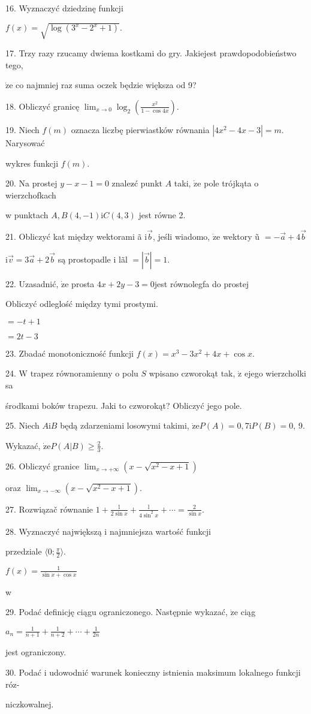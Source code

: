 \documentclass[a4paper,12pt]{article}
\begin{document}
16. Wyznaczyć dziedzinę funkcji

$f(x)=\sqrt{\log(3^{x}-2^{x}+1)}.$

17. Trzy razy rzucamy dwiema kostkami do gry. Jakiejest prawdopodobieństwo tego,

$\dot{\mathrm{z}}\mathrm{e}$ co najmniej raz suma oczek będzie większa od 9?

18. Obliczyć granicę $\displaystyle \lim_{x\rightarrow 0}\log_{2}(\frac{x^{2}}{1-\cos 4x}).$

19. Niech $f(m)$ oznacza liczbę pierwiastków równania $|4x^{2}-4x-3|=m$. Narysować

wykres funkcji $f(m).$

20. Na prostej $y-x-1=0$ znalez$\acute{}$ć punkt $A$ taki, $\dot{\mathrm{z}}\mathrm{e}$ pole trójkąta o wierzchofkach

w punktach $A, B(4,-1)\mathrm{i}C(4,3)$ jest równe 2.

21. Obliczyć kat między wektorami ã $\mathrm{i}\vec{b}$, jeśli wiadomo, $\dot{\mathrm{z}}\mathrm{e}$ wektory ũ $= -\vec{a}+4\vec{b}$

$\mathrm{i}\vec{v}=3\vec{a}+2\vec{b}$ są prostopadle i lãl $=|\vec{b}|=1.$

22. Uzasadnić, $\dot{\mathrm{z}}\mathrm{e}$ prosta $4x+2y-3=0$jest równolegfa do prostej 

Obliczyć odleglość między tymi prostymi.

$= -t+1$

$= 2t-3$

23. Zbadać monotoniczność funkcji $f(x)=x^{3}-3x^{2}+4x+\cos x.$

24. $\mathrm{W}$ trapez równoramienny o polu $S$ wpisano czworokąt tak, $\dot{\mathrm{z}}$ ejego wierzcholki sa

środkami boków trapezu. Jaki to czworokąt? Obliczyć jego pole.

25. Niech $A\mathrm{i}B$ będą zdarzeniami losowymi takimi, $\dot{\mathrm{z}}\mathrm{e}P(A) =0, 7\mathrm{i}P(B) =0$, 9.

Wykazać, $\displaystyle \dot{\mathrm{z}}\mathrm{e}P(A|B)\geq\frac{2}{3}.$

26. Obliczyć granice $\displaystyle \lim_{x\rightarrow+\infty}(x-\sqrt{x^{2}-x+1})$

oraz $\displaystyle \lim_{x\rightarrow-\infty}(x-\sqrt{x^{2}-x+1}).$

27. Rozwiązač równanie $1+\displaystyle \frac{\mathrm{l}}{2\sin x}+\frac{\mathrm{l}}{4\sin^{2}x}+\cdots=\frac{2}{\sin x}.$

28. Wyznaczyć największą i najmniejsza wartość funkcji

przedziale $\displaystyle \langle 0;\frac{\pi}{2}\rangle.$

$f(x) = \displaystyle \frac{1}{\sin x+\cos x}$

w

29. Podać definicję ciągu ograniczonego. Następnie wykazać, $\dot{\mathrm{z}}\mathrm{e}$ ciąg

$a_{n}=\displaystyle \frac{1}{n+1}+\frac{1}{n+2}+\cdots+\frac{1}{2n}$

jest ograniczony.

30. Podać i udowodnić warunek konieczny istnienia maksimum lokalnego funkcji róz-

niczkowalnej.
\end{document}
